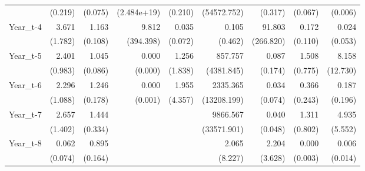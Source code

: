 \begin{table}[htbp]
\begin{tabular}{l*{8}{D{.}{.}{-1}}}
                    &     (0.219)         &     (0.075)         & (2.484e+19)         &     (0.210)         & (54572.752)         &     (0.317)         &     (0.067)         &     (0.006)         \\
Year\_t-4            &       3.671\sym{***}&       1.163\sym{\%}  &       9.812         &       0.035\sym{*}  &       0.105         &      91.803\sym{\%}  &       0.172\sym{***}&       0.024\sym{*}  \\
                    &     (1.782)         &     (0.108)         &   (394.398)         &     (0.072)         &     (0.462)         &   (266.820)         &     (0.110)         &     (0.053)         \\
Year\_t-5            &       2.401\sym{**} &       1.045         &       0.000         &       1.256         &     857.757         &       0.087         &       1.508         &       8.158         \\
                    &     (0.983)         &     (0.086)         &     (0.000)         &     (1.838)         &  (4381.845)         &     (0.174)         &     (0.775)         &    (12.730)         \\
Year\_t-6            &       2.296\sym{*}  &       1.246\sym{\%}  &       0.000         &       1.955         &    2335.365         &       0.034\sym{\%}  &       0.366\sym{\%}  &       0.187\sym{\%}  \\
                    &     (1.088)         &     (0.178)         &     (0.001)         &     (4.357)         & (13208.199)         &     (0.074)         &     (0.243)         &     (0.196)         \\
Year\_t-7            &       2.657\sym{*}  &       1.444\sym{\%}  &                     &                     &    9866.567\sym{***}&       0.040\sym{***}&       1.311         &       4.935         \\
                    &     (1.402)         &     (0.334)         &                     &                     & (33571.901)         &     (0.048)         &     (0.802)         &     (5.552)         \\
Year\_t-8            &       0.062\sym{**} &       0.895         &                     &                     &       2.065         &       2.204         &       0.000         &       0.006\sym{**} \\
                    &     (0.074)         &     (0.164)         &                     &                     &     (8.227)         &     (3.628)         &     (0.003)         &     (0.014)         \\

\end{tabular}
\end{table}
